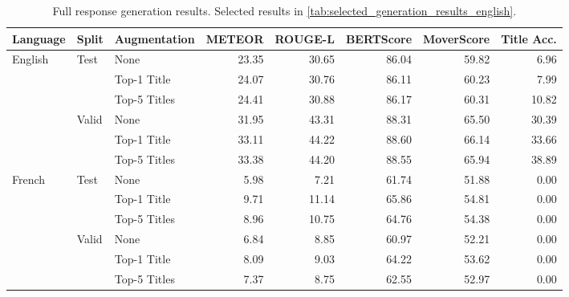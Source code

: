 \documentclass[11pt]{article}
\begin{document}
\begin{table*}[h]
    \small
    \centering
\begin{tabular}{lllrrrrr}
\toprule
Language & Split & Augmentation &  METEOR &  ROUGE-L &  BERTScore &  MoverScore &  Title Acc. \\
\midrule
English & Test & None &   23.35 &    30.65 &      86.04 &       59.82 &        6.96 \\
       &       & Top-1 Title &   24.07 &    30.76 &      86.11 &       60.23 &        7.99 \\
       &       & Top-5 Titles &   24.41 &    30.88 &      86.17 &       60.31 &       10.82 \\
       & Valid & None &   31.95 &    43.31 &      88.31 &       65.50 &       30.39 \\
       &       & Top-1 Title &   33.11 &    44.22 &      88.60 &       66.14 &       33.66 \\
       &       & Top-5 Titles &   33.38 &    44.20 &      88.55 &       65.94 &       38.89 \\
\midrule
French & Test & None &    5.98 &     7.21 &      61.74 &       51.88 &        0.00 \\
       &       & Top-1 Title &    9.71 &    11.14 &      65.86 &       54.81 &        0.00 \\
       &       & Top-5 Titles &    8.96 &    10.75 &      64.76 &       54.38 &        0.00 \\
       & Valid & None &    6.84 &     8.85 &      60.97 &       52.21 &        0.00 \\
       &       & Top-1 Title &    8.09 &     9.03 &      64.22 &       53.62 &        0.00 \\
       &       & Top-5 Titles &    7.37 &     8.75 &      62.55 &       52.97 &        0.00 \\
\bottomrule
\end{tabular}
    \caption{Full response generation results. Selected results in \autoref{tab:selected_generation_results_english}.}
    \label{tab:full_generation_results}
\end{table*}
\end{document}
